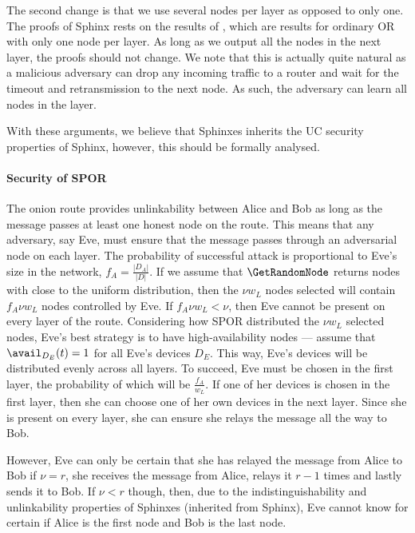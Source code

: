 The second change is that we use several nodes per layer as opposed to only 
one.
The proofs of Sphinx rests on the results of \textcite{CLOnionRouting}, which 
are results for ordinary \ac{OR} with only one node per layer.
As long as we output all the nodes in the next layer, the proofs should not 
change.
We note that this is actually quite natural as a malicious adversary can drop 
any incoming traffic to a router and wait for the timeout and retransmission to 
the next node.
As such, the adversary can learn all nodes in the layer.

With these arguments, we believe that Sphinxes inherits the \ac{UC} security 
properties of Sphinx, however, this should be formally analysed.

\paragraph*{Security of \acs*{SPOR}}

The onion route provides unlinkability between Alice and Bob as long as the 
message passes at least one honest node on the route.
This means that any adversary, say Eve,  must ensure that the message passes 
through an adversarial node on each layer.
The probability of successful attack is proportional to Eve's size in the 
network, \ie \(f_A = \frac{|D_A|}{|D|}\).
If we assume that \(\GetRandomNode\) returns nodes with close to the uniform 
distribution, then the \(\nu w_L\) nodes selected will contain \(f_A \nu w_L\) 
nodes controlled by Eve.
If \(f_A \nu w_L < \nu\), then Eve cannot be present on every layer of the 
route.
Considering how \ac{SPOR} distributed the \(\nu w_L\) selected nodes, Eve's 
best strategy is to have high-availability nodes --- assume that 
\(\avail_{D_E}(t) = 1\) for all Eve's devices \(D_E\).
This way, Eve's devices will be distributed evenly across all layers.
To succeed, Eve must be chosen in the first layer, the probability of which 
will be \(\frac{f_A}{w_L}\).
If one of her devices is chosen in the first layer, then she can choose one of 
her own devices in the next layer.
Since she is present on every layer, she can ensure she relays the message all 
the way to Bob.

However, Eve can only be certain that she has relayed the message from Alice to 
Bob if \(\nu = r\), \ie she receives the message from Alice, relays it \(r-1\) 
times and lastly sends it to Bob.
If \(\nu < r\) though, then, due to the indistinguishability and unlinkability 
properties of Sphinxes (inherited from Sphinx), Eve cannot know for certain if 
Alice is the first node and Bob is the last node.

